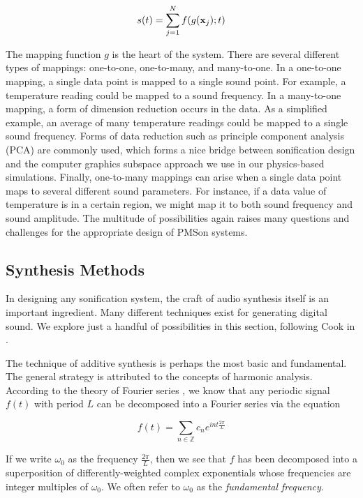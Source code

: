 \begin{equation}
s(t) = \sum_{j=1}^N f(g(\mathbf{x}_j); t)
\end{equation}

The mapping function $g$ is the heart of the system. There are several 
different types of mappings: one-to-one, one-to-many, and many-to-one. In a 
one-to-one mapping, a single data point is mapped to a single sound point. 
For example, a temperature reading could be mapped to a sound frequency. In a 
many-to-one mapping, a form of dimension reduction occurs in the data. As a 
simplified example, an average of many temperature readings could be mapped 
to a single sound frequency. Forms of data reduction such as principle 
component analysis (PCA) are commonly used, which forms a nice bridge between 
sonification design and the computer graphics subspace approach we use in our 
physics-based simulations. Finally, one-to-many mappings can arise when a 
single data point maps to several different sound parameters. For instance, 
if a data value of temperature is in a certain region, we might map it to 
both sound frequency and sound amplitude. The multitude of possibilities 
again raises many questions and challenges for the appropriate design of 
PMSon systems.

\subsection{Synthesis Methods}
In designing any sonification system, the craft of audio synthesis itself is 
an important ingredient. Many different techniques exist for generating 
digital sound. We explore just a handful of possibilities in this section, following Cook in \cite{hermann2011sonification}.

The technique of additive synthesis is perhaps the most basic and 
fundamental. The general strategy is attributed to the concepts of harmonic 
analysis. According to the theory of Fourier series \cite{katznelson2004introduction}, we know that any 
periodic signal $f(t)$ with period $L$ can be decomposed into a Fourier 
series via the equation

\begin{equation}
f(t) = \sum_{n \in \mathbb{Z}} c_n e^{int \frac{2\pi}{L}}
\end{equation}

If we write $\omega_0$ as the frequency $\frac{2\pi}{L}$, then we see that $f$
 has been decomposed into a superposition of differently-weighted complex 
exponentials whose frequencies are integer multiples of $\omega_0$. We often 
refer to $\omega_0$ as the {\em fundamental frequency}. 

